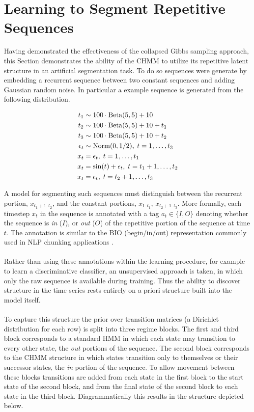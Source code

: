 \documentclass[12pt]{report}
\newcommand{\1}[0]{\mathbbm{1}}
\newcommand{\Beta}[0]{\textnormal{Beta}}
\newcommand{\Norm}[0]{\textnormal{Norm}}
\newcommand{\seq}[3]{\ensuremath{#1_{{#2}:{#3}}}}
\begin{document}
\section{Learning to Segment Repetitive Sequences}
Having demonstrated the effectiveness of the collapsed Gibbs sampling approach, 
this Section demonstrates the ability of the \ac{CHMM} to utilize its repetitive 
latent structure in an artificial segmentation task. To do so sequences were generate by
embedding a recurrent sequence between two constant sequences and adding Gaussian random noise.
In particular a example sequence is generated from the following distribution.

\begin{align*}
    t_1 & \sim 100 \cdot \Beta(5, 5) + 10 \\
    t_2 & \sim 100 \cdot \Beta(5, 5) + 10 + t_1 \\
    t_3 & \sim 100 \cdot \Beta(5, 5) + 10 + t_2 \\
    \epsilon_t & \sim \Norm(0, 1/2),\; t = 1,\ldots,t_3 \\
    x_t &= \epsilon_t,\; t=1,\ldots,t_1 \\
    x_t &= \sin(t) + \epsilon_t,\; t=t_1+1,\ldots,t_2 \\
    x_t &= \epsilon_t,\; t=t_2 + 1,\ldots,t_3\\
\end{align*}

A model for segmenting such sequences must distinguish between the recurrent portion,
$\seq{x}{t_1+1}{t_2}$, and the constant portions, $\seq{x}{1}{t_1}$, $\seq{x}{t_2+1}{t_3}$.
More formally, each timestep $x_t$ in the sequence is annotated with a tag $a_t \in \{I, O\}$
denoting whether the sequence is \emph{in} ($I$), or \emph{out} ($O$) of the repetitive portion
of the sequence at time $t$. The annotation is similar to the BIO (begin/in/out) representation
commonly used in \ac{NLP} chunking applications \cite{ramshaw-bio}.
\\\\ 
Rather than using these annotations within the learning procedure, for example to learn a 
discriminative classifier, an unsupervised approach is taken, in which only the raw sequence 
is available during training. Thus the ability to discover structure in the time series rests 
entirely on a priori structure built into the model itself.
\\\\
To capture this structure the prior over transition matrices (a Dirichlet distribution for each row) 
is split into three regime blocks. The first and third block corresponds to a standard \ac{HMM}
in which each state may transition to every other state, the \emph{out} portions of the sequence. 
The second block corresponds to the \ac{CHMM} structure in which states transition
only to themselves or their successor states, the \emph{in} portion of the sequence.
To allow movement between these blocks transitions are added from each state in the first block
to the start state of the second block, and from the final state of the second block to each state
in the third block. Diagrammatically this results in the structure depicted below.
\end{document}
